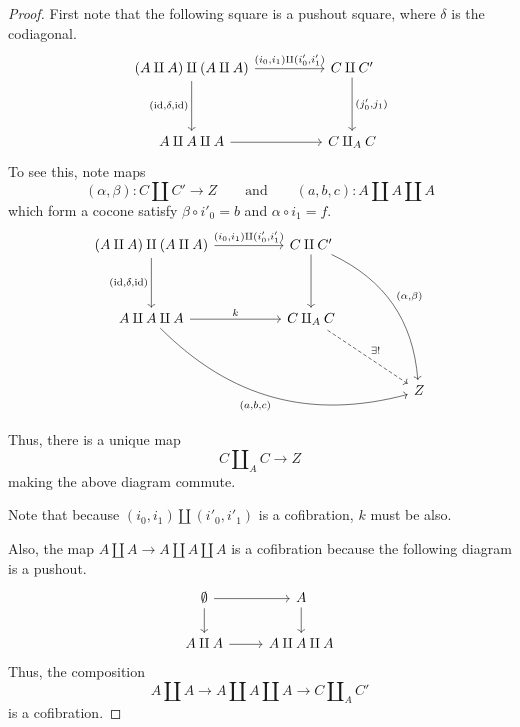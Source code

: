 \documentclass[main.tex]{subfiles}
\begin{document}
\begin{proof}
  First note that the following square is a pushout square, where $\delta$ is the codiagonal.
  \begin{equation*}
    \begin{tikzcd}[row sep=huge, column sep=huge]
      (A \amalg A) \amalg (A \amalg A)
      \arrow[r, "{(i_{0}, i_{1}) \amalg (i'_{0}, i'_{1})}"]
      \arrow[d, swap, "{(\id, \delta, \id)}"]
      & C \amalg C'
      \arrow[d, "{(j'_{0}, j_{1})}"]
      \\
      A \amalg A \amalg A
      \arrow[r]
      & C \amalg_{A} C
    \end{tikzcd}
  \end{equation*}
  To see this, note maps
  \begin{equation*}
    (\alpha, \beta)\colon C \amalg C' \to Z \qquad\text{and}\qquad (a,b,c)\colon A \amalg A \amalg A
  \end{equation*}
  which form a cocone satisfy $\beta \circ i'_{0} = b$ and $\alpha \circ i_{1} = f$.
  \begin{equation*}
    \begin{tikzcd}[row sep=huge, column sep=huge]
      (A \amalg A) \amalg (A \amalg A)
      \arrow[r, "{(i_{0}, i_{1}) \amalg (i'_{0}, i'_{1})}"]
      \arrow[d, swap, "{(\id, \delta, \id)}"]
      & C \amalg C'
      \arrow[d]
      \arrow[ddr, bend left, "{(\alpha, \beta)}"]
      \\
      A \amalg A \amalg A
      \arrow[r, "k"]
      \arrow[drr, bend right, swap, "{(a,b,c)}"]
      & C \amalg_{A} C
      \arrow[dr, dashed, "\exists!"]
      \\
      && Z
    \end{tikzcd}
  \end{equation*}
  Thus, there is a unique map
  \begin{equation*}
    C \amalg_{A} C \to Z
  \end{equation*}
  making the above diagram commute.

  Note that because $(i_{0}, i_{1}) \amalg (i'_{0}, i'_{1})$ is a cofibration, $k$ must be also.

  Also, the map $A \amalg A \to A \amalg A \amalg A$ is a cofibration because the following diagram is a pushout.
  \begin{equation*}
    \begin{tikzcd}
      \emptyset
      \arrow[r]
      \arrow[d]
      & A
      \arrow[d]
      \\
      A \amalg A
      \arrow[r]
      & A \amalg A \amalg A
    \end{tikzcd}
  \end{equation*}
  Thus, the composition
  \begin{equation*}
    A \amalg A \to A \amalg A \amalg A \to C \amalg_{A} C'
  \end{equation*}
  is a cofibration.
\end{proof}
\end{document}

